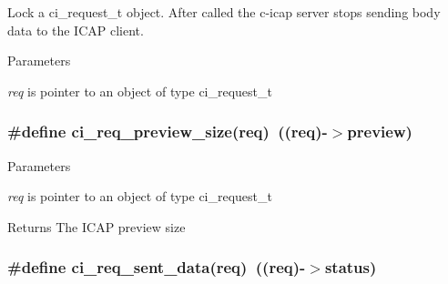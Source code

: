 Lock a ci\_\-request\_\-t object. After called the c-\/icap server stops sending body data to the ICAP client. 
\begin{DoxyParams}{Parameters}
\item[{\em req}]is pointer to an object of type ci\_\-request\_\-t \end{DoxyParams}
\hypertarget{group__REQUEST_ga232d8f27e899f6ca044c48808c6de5f0}{
\subsubsection[{ci\_\-req\_\-preview\_\-size}]{\setlength{\rightskip}{0pt plus 5cm}\#define ci\_\-req\_\-preview\_\-size(req)~((req)-\/$>$preview)}}
\label{group__REQUEST_ga232d8f27e899f6ca044c48808c6de5f0}

\begin{DoxyParams}{Parameters}
\item[{\em req}]is pointer to an object of type ci\_\-request\_\-t \end{DoxyParams}
\begin{DoxyReturn}{Returns}
The ICAP preview size 
\end{DoxyReturn}
\hypertarget{group__REQUEST_ga63d1227f02799e998ef8aa4a6066f791}{
\subsubsection[{ci\_\-req\_\-sent\_\-data}]{\setlength{\rightskip}{0pt plus 5cm}\#define ci\_\-req\_\-sent\_\-data(req)~((req)-\/$>$status)}}
\label{group__REQUEST_ga63d1227f02799e998ef8aa4a6066f791}

